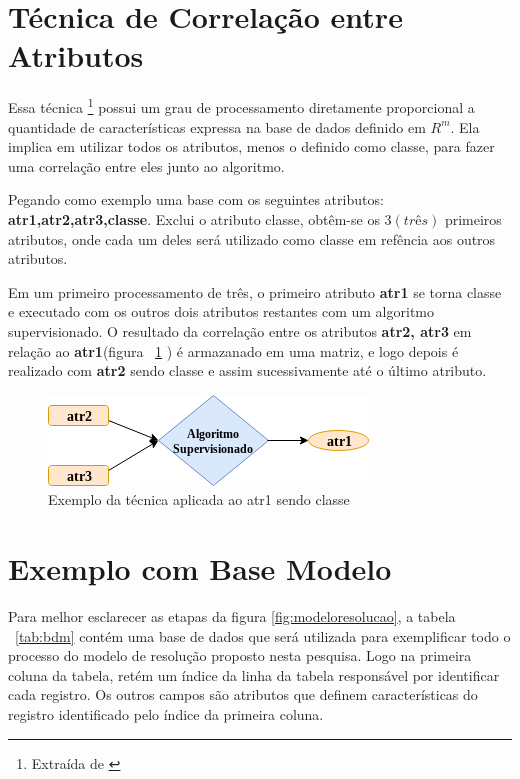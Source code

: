 \section{Técnica de Correlação entre Atributos }\label{sec:tecnica}

Essa técnica \footnote{Extraída  de \cite{Lopes}} possui um grau de processamento diretamente proporcional a quantidade de características expressa na base de dados definido em ${R^m}$. Ela implica em utilizar todos os atributos, menos o definido como classe, para fazer uma correlação entre eles junto ao algoritmo.


Pegando como exemplo uma base com os seguintes atributos: \textbf{atr1,atr2,atr3,classe}. Exclui o atributo classe, obtêm-se os ${3 (três)}$ primeiros atributos, onde cada um deles será utilizado como classe em refência aos outros atributos. 

Em um primeiro processamento de três, o primeiro atributo \textbf{atr1} se torna classe e executado com os outros dois atributos restantes com um algoritmo supervisionado. O resultado da correlação entre os atributos \textbf{atr2, atr3} em relação ao \textbf{atr1}(figura ~\ref{fig:tecnicamodelo} ) é armazanado em uma matriz, e logo depois é realizado com \textbf{atr2} sendo classe e assim sucessivamente até o último atributo.


\begin{figure}[h!]
        \centering
        \includegraphics[scale=0.7]{figs/tecnicamodelo.png}
        \caption{Exemplo da técnica aplicada ao atr1 sendo classe } \label{fig:tecnicamodelo}
\end{figure}


\section{Exemplo com Base Modelo}

Para melhor esclarecer as etapas da figura \ref{fig:modeloresolucao}, a tabela ~\ref{tab:bdm} contém uma base de dados que será utilizada para exemplificar todo o processo do modelo de resolução proposto nesta pesquisa. Logo na primeira coluna da tabela, retém um índice da linha da tabela responsável por identificar cada registro. Os outros campos são atributos que definem características do registro identificado pelo índice da primeira coluna.

